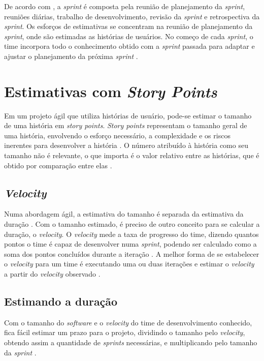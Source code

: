  De acordo com , a 
 \textit{sprint} é composta pela reunião de planejamento da \textit{sprint}, reuniões diárias, trabalho de desenvolvimento,
 revisão da \textit{sprint} e retrospectiva da \textit{sprint}. Os esforços de estimativas se concentram na reunião de
 planejamento da \textit{sprint}, onde são estimadas as histórias de usuários. No começo de cada \textit{sprint}, o time 
 incorpora todo o conhecimento obtido com a \textit{sprint} passada para adaptar e ajustar o planejamento da próxima
 \textit{sprint} \cite{cohn06}.
 
\section{Estimativas com \textit{Story Points}}

 Em um projeto ágil 
 que utiliza histórias de usuário, pode-se estimar o tamanho de uma história em \textit{story points}.
 \textit{Story points} representam o tamanho geral de uma história, envolvendo o esforço necessário, a complexidade e os
 riscos inerentes para desenvolver a história \cite{cohn06}. O número atribuído à história como seu tamanho não é relevante,
 o que importa é o valor relativo entre as histórias, que é obtido por comparação entre elas \cite{cohn06}.
 
  \subsection{\textit{Velocity}}
  
    Numa abordagem ágil, a estimativa do tamanho é separada da estimativa da duração \cite{cohn06}.
    Com o tamanho estimado, é preciso de outro conceito para se calcular a duração, o \textit{velocity}.
    O \textit{velocity} mede a taxa de progresso do time, dizendo quantos pontos o time é capaz de desenvolver
    numa \textit{sprint}, podendo ser calculado como a soma dos pontos concluídos durante a iteração \cite{cohn06}.
    A melhor forma de se estabelecer o \textit{velocity} para um time é executando uma ou duas iterações e estimar o
    \textit{velocity} a partir do \textit{velocity} observado \cite{cohn06}.
 
  \subsection{Estimando a duração}
    
    Com o tamanho do \textit{software} e o \textit{velocity} do time de desenvolvimento conhecido, fica fácil estimar
    um prazo para o projeto, dividindo o tamanho pelo \textit{velocity}, obtendo assim a quantidade de \textit{sprints}
    necessárias, e multiplicando pelo tamanho da \textit{sprint} \cite{cohn06}.
    
